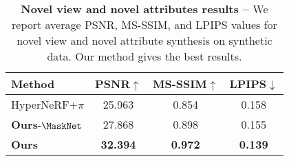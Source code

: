 \begin{table}
  \centering
  \begin{tabular}{@{}lccc@{}}
    \toprule
    Method                     & PSNR$\uparrow$  & MS-SSIM$\uparrow$ & LPIPS$\downarrow$ \\
    \midrule
    HyperNeRF{+}$\pi$          & 25.963          & 0.854             & 0.158             \\
    \textbf{Ours}{-}$\MaskNet$ & 27.868          & 0.898             & 0.155             \\
    \textbf{Ours}              & \textbf{32.394} & \textbf{0.972}    & \textbf{0.139}    \\
    \bottomrule
  \end{tabular}
  \caption{
    \textbf{Novel view and novel attributes results -- }
    We report average PSNR, MS-SSIM, and LPIPS values for novel view and novel
    attribute synthesis on synthetic data.
    Our method gives the best results.
  } %
  \label{tab:conerf-kubric3d}
\end{table}